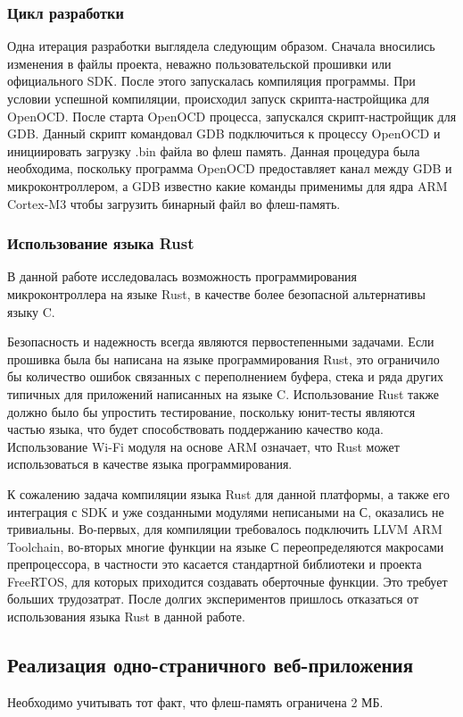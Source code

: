 \subsubsection{Цикл разработки}
Одна итерация разработки выглядела следующим образом. Сначала вносились изменения в файлы проекта, неважно пользовательской прошивки или официального SDK. После этого запускалась компиляция программы. При условии успешной компиляции, происходил запуск скрипта-настройщика для OpenOCD. После старта OpenOCD процесса, запускался скрипт-настройщик для GDB. Данный скрипт командовал GDB подключиться к процессу OpenOCD и инициировать загрузку .bin файла во флеш память. Данная процедура была необходима, поскольку программа OpenOCD предоставляет канал между GDB и микроконтроллером, а GDB известно какие команды применимы для ядра ARM Cortex-M3 чтобы загрузить бинарный файл во флеш-память. 

\subsubsection{Использование языка Rust}
В данной работе исследовалась возможность программирования микроконтроллера на языке Rust, в качестве более безопасной альтернативы языку C.

Безопасность и надежность всегда являются первостепенными задачами. Если прошивка была бы написана на языке программирования Rust, это ограничило бы количество ошибок связанных с переполнением буфера, стека и ряда других типичных для приложений написанных на языке C. Использование Rust также должно было бы упростить тестирование, поскольку юнит-тесты являются частью языка, что будет способствовать поддержанию качество кода. Использование Wi-Fi модуля на основе ARM означает, что Rust может использоваться в качестве языка программирования.

К сожалению задача компиляции языка Rust для данной платформы, а также его интеграция с SDK и уже созданными модулями неписаными на С, оказались не тривиальны. Во-первых, для компиляции требовалось подключить LLVM ARM Toolchain, во-вторых многие функции на языке С переопределяются макросами препроцессора, в частности это касается стандартной библиотеки и проекта FreeRTOS, для которых приходится создавать оберточные функции. Это требует больших трудозатрат. После долгих экспериментов пришлось отказаться от использования языка Rust в данной работе.



\subsection{Реализация одно-страничного веб-приложения}
Необходимо учитывать тот факт, что флеш-память ограничена 2 МБ.


